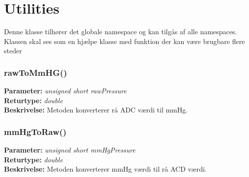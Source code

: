 \section{Utilities}
Denne klasse tilhører det globale namespace og kan tilgås af alle namespaces. Klassen skal ses som en hjælpe klasse med funktion der kan være brugbare flere steder

\subsubsection{rawToMmHG()}
\textbf{Parameter: } \textit{unsigned short rawPressure}
\\ \textbf{Returtype: } \textit{double}
\\ \textbf{Beskrivelse: } Metoden konverterer rå ADC værdi til mmHg.

\subsubsection{mmHgToRaw()}
\textbf{Parameter: } \textit{unsigned short mmHgPressure}
\\ \textbf{Returtype: } \textit{double}
\\ \textbf{Beskrivelse: } Metoden konverterer mmHg værdi til rå ACD værdi.